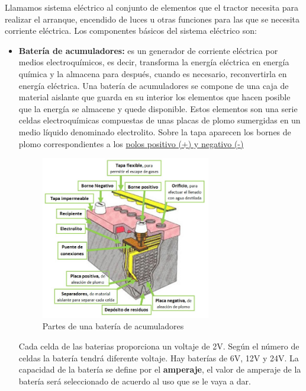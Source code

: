 \documentclass[a4paper,12pt,oneside]{book}
\begin{document}
Llamamos sistema eléctrico al conjunto de elementos que el tractor necesita
para realizar el arranque, encendido de luces u otras funciones para las que se
necesita corriente eléctrica. Los componentes básicos del sistema eléctrico son:
\begin{itemize}
\item \textbf{Batería de acumuladores:} es un generador de corriente eléctrica por medios
electroquímicos, es decir, transforma la energía eléctrica en energía química
y la almacena para después, cuando es necesario, reconvertirla en energía
eléctrica. Una batería de acumuladores se compone de una caja de material
aislante que guarda en su interior los elementos que hacen posible que la
energía se almacene y quede disponible. Estos elementos son una serie celdas
electroquímicas compuestas de unas placas de plomo sumergidas en un medio
líquido denominado electrolito. Sobre la tapa aparecen los bornes de plomo
correspondientes a los \uline{polos positivo (+) y negativo (-)}
 \begin{figure}[htbp]
\centering
\includegraphics[width=0.7\textwidth]{./img_0009/bateria_partes.jpg}
\caption{Partes de una batería de acumuladores}
\end{figure}
 Cada celda de las baterias proporciona un voltaje de 2V. Según el número de
celdas la batería tendrá diferente voltaje. Hay baterías de 6V, 12V y 24V. La
capacidad de la batería se define por el \textbf{amperaje}, el valor de amperaje de
la batería será seleccionado de acuerdo al uso que se le vaya a dar.
\end{itemize}
\newpage
\end{document}
